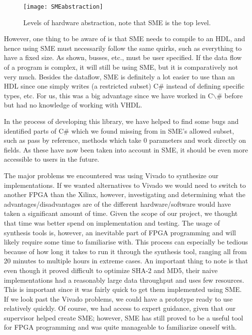 \documentclass[a4paper, openany]{book}
\begin{document}
\begin{figure}[H]
  \centering
  \texttt{[image: SMEabstraction]}
  \caption{Levels of hardware abstraction, note that SME is the top level.}
\end{figure}

However, one thing to be aware of is that SME needs to compile to an HDL, and hence using SME must necessarily follow the same quirks, such as everything to have a fixed size. As shown, busses, etc., must be user specified. If the data flow of a program is complex, it will still be using SME, but it is comparatively not very much. Besides the dataflow, SME is definitely a lot easier to use than an HDL since one simply writes (a restricted subset) C\# instead of defining specific types, etc.
For us, this was a big advantage since we have worked in C$\backslash$# before but had no knowledge of working with VHDL.

In the process of developing this library, we have helped to find some bugs and identified parts of C\# which we found missing from in SME's allowed subset, such as pass by reference, methods which take 0 parameters and work directly on fields. As these have now been taken into account in SME, it should be even more accessible to users in the future.

The major problems we encountered was using Vivado to synthesize our implementations.
If we wanted alternatives to Vivado we would need to switch to another FPGA than the Xilinx, however, investigating and determining what the advantages/disadvantages are of the different hardware/software would have taken a significant amount of time.
Given the scope of our project, we thought that time was better spend on implementation and testing. The usage of synthesis tools is, however, an inevitable part of FPGA programming and will likely require some time to familiarise with. This process can especially be tedious because of how long it takes to run it through the synthesis tool, ranging all from 20 minutes to multiple hours in extreme cases. An important thing to note is that even though it proved difficult to optimize SHA-2 and MD5, their naive implementations had a
reasonably large data throughput and uses few resources. This is important since it was fairly quick to get them implemented using SME.
If we look past the Vivado problems, we could have a prototype ready to use relatively quickly.
Of course, we had access to expert guidance, given that our supervisor helped create SME; however, SME has still proved to be a useful tool for FPGA programming and was quite manageable to familiarize oneself with.
\end{document}
